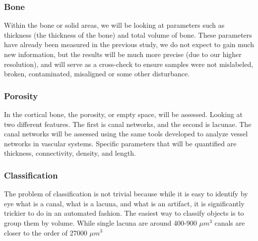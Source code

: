 \subsubsection*{Bone}
Within the bone or solid areas, we will be looking at parameters such as thickness (the thickness of the bone) and total volume of bone. These parameters have already been measured in the previous study, we do not expect to gain much new information, but the results will be much more precise (due to our higher resolution), and will serve as a cross-check to ensure samples were not mislabeled, broken, contaminated, misaligned or some other disturbance.
\subsubsection*{Porosity}
In the cortical bone, the porosity, or empty space, will be assessed. Looking at two different features. The first is canal networks, and the second is lacunae.
The canal networks will be assessed using the same tools developed to analyze vessel networks in vascular systems. Specific parameters that will be quantified are thickness, connectivity, density, and length.
\subsubsection*{Classification}
The problem of classification is not trivial because while it is easy to identify by eye what is a canal, what is a lacuna, and what is an artifact, it is significantly trickier to do in an automated fashion. The easiest way to classify objects is to group them by volume. While single lacuna are around 400-900 $\mu m^3$ canals are closer to the order of 27000 $\mu m^3$

